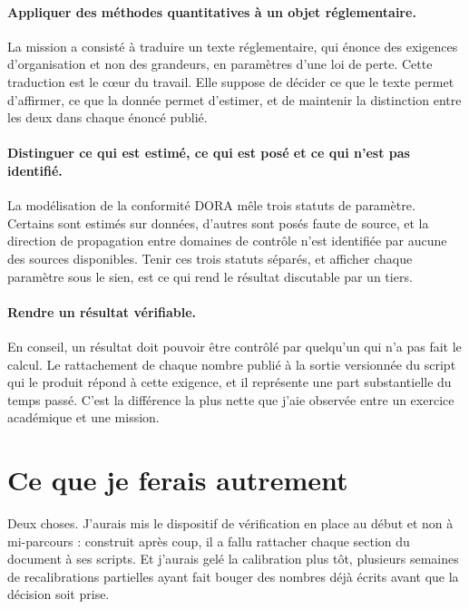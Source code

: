 \paragraph{Appliquer des méthodes quantitatives à un objet réglementaire.} La
mission a consisté à traduire un texte réglementaire, qui énonce des exigences
d'organisation et non des grandeurs, en paramètres d'une loi de perte. Cette
traduction est le cœur du travail. Elle suppose de décider ce que le texte permet
d'affirmer, ce que la donnée permet d'estimer, et de maintenir la distinction entre
les deux dans chaque énoncé publié.

\paragraph{Distinguer ce qui est estimé, ce qui est posé et ce qui n'est pas
identifié.} La modélisation de la conformité DORA mêle trois statuts de
paramètre. Certains sont estimés sur données, d'autres sont posés faute de source, et
la direction de propagation entre domaines de contrôle n'est identifiée par aucune
des sources disponibles. Tenir ces trois statuts séparés, et afficher chaque
paramètre sous le sien, est ce qui rend le résultat discutable par un tiers.

\paragraph{Rendre un résultat vérifiable.} En conseil, un résultat doit pouvoir être
contrôlé par quelqu'un qui n'a pas fait le calcul. Le rattachement de chaque nombre
publié à la sortie versionnée du script qui le produit répond à cette exigence, et il
représente une part substantielle du temps passé. C'est la différence la plus nette
que j'aie observée entre un exercice académique et une mission.

\section{Ce que je ferais autrement}
\label{ens:autrement}

Deux choses. J'aurais mis le dispositif de vérification en place au début et non à
mi-parcours : construit après coup, il a fallu rattacher chaque section du document à
ses scripts. Et j'aurais gelé la calibration plus tôt, plusieurs semaines de
recalibrations partielles ayant fait bouger des nombres déjà écrits avant que la
décision soit prise.
